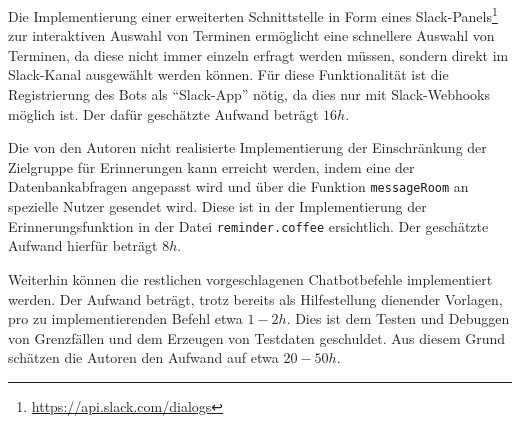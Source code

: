 Die Implementierung einer erweiterten Schnittstelle in Form eines Slack-Panels\footnote{\url{https://api.slack.com/dialogs}} zur interaktiven Auswahl von Terminen ermöglicht eine schnellere Auswahl von Terminen, da diese nicht immer einzeln erfragt werden müssen, sondern direkt im Slack-Kanal ausgewählt werden können.
Für diese Funktionalität ist die Registrierung des Bots als \enquote{Slack-App} nötig, da dies nur mit Slack-Webhooks möglich ist.
Der dafür geschätzte Aufwand beträgt $16h$.

Die von den Autoren nicht realisierte Implementierung der Einschränkung der Zielgruppe für Erinnerungen kann erreicht werden, indem eine der Datenbankabfragen angepasst wird und über die Funktion \texttt{messageRoom} an spezielle Nutzer gesendet wird. Diese ist in der Implementierung der Erinnerungsfunktion in der Datei \texttt{reminder.coffee} ersichtlich. Der geschätzte Aufwand hierfür beträgt $8h$.

Weiterhin können die restlichen vorgeschlagenen Chatbotbefehle implementiert werden. Der Aufwand beträgt, trotz bereits als Hilfestellung dienender Vorlagen, pro zu implementierenden Befehl etwa $1-2h$. Dies ist dem Testen und Debuggen von Grenzfällen und dem Erzeugen von Testdaten geschuldet. Aus diesem Grund schätzen die Autoren den Aufwand auf etwa $20-50h$.
